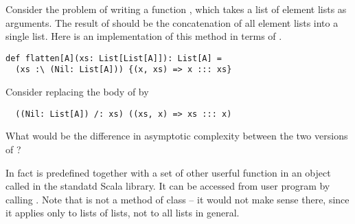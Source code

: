\begin{exercise} Consider the problem of writing a function ,
which takes a list of element lists as arguments. The result of
 should be the concatenation of all element lists into a
single list. Here is an implementation of this method in terms of 
\code{:\\}.
\begin{lstlisting}
def flatten[A](xs: List[List[A]]): List[A] =
  (xs :\ (Nil: List[A])) {(x, xs) => x ::: xs}
\end{lstlisting} 
Consider replacing the body of \lstinline@flatten@
by 
\begin{lstlisting}
  ((Nil: List[A]) /: xs) ((xs, x) => xs ::: x)
\end{lstlisting}
What would be the difference in asymptotic
complexity between the two versions of \lstinline@flatten@?

In fact  is predefined together with a set of other
userful function in an object called  in the standatd Scala
library. It can be accessed from user program by calling
. Note that  is not a method of class
 -- it would not make sense there, since it applies only
to lists of lists, not to all lists in general.
\end{exercise}

